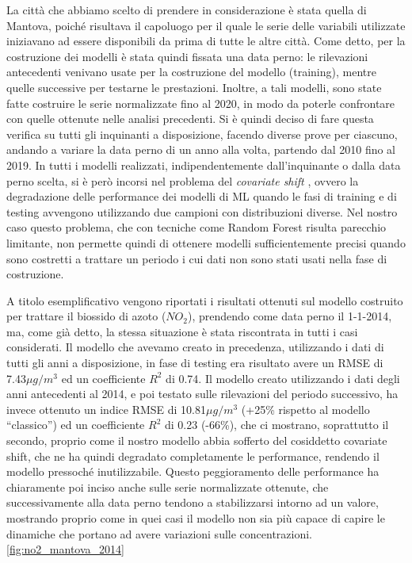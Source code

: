 La città che abbiamo scelto di prendere in considerazione è stata quella di Mantova, poiché risultava il capoluogo per il quale le serie delle variabili utilizzate iniziavano ad essere disponibili da prima di tutte le altre città. Come detto, per la costruzione dei modelli è stata quindi fissata una data perno: le rilevazioni antecedenti venivano usate per la costruzione del modello (training), mentre quelle successive per testarne le prestazioni. Inoltre, a tali modelli, sono state fatte costruire le serie normalizzate fino al 2020, in modo da poterle confrontare con quelle ottenute nelle analisi precedenti.  
Si è quindi deciso di fare questa verifica su tutti gli inquinanti a disposizione, facendo diverse prove per ciascuno, andando a variare la data perno di un anno alla volta, partendo dal 2010 fino al 2019.  
In tutti i modelli realizzati, indipendentemente dall'inquinante o dalla data perno scelta, si è però incorsi nel problema del \textit{covariate shift} \cite{quinonero2009dataset}, ovvero la degradazione delle performance dei modelli di ML quando le fasi di training e di testing avvengono utilizzando due campioni con distribuzioni diverse. Nel nostro caso questo problema, che con tecniche come Random Forest risulta parecchio limitante, non permette quindi di ottenere modelli sufficientemente precisi quando sono costretti a trattare un periodo i cui dati non sono stati usati nella fase di costruzione.

A titolo esemplificativo vengono riportati i risultati ottenuti sul modello costruito per trattare il biossido di azoto ($NO_2$), prendendo come data perno il 1-1-2014, ma, come già detto, la stessa situazione è stata riscontrata in tutti i casi considerati.
Il modello che avevamo creato in precedenza, utilizzando i dati di tutti gli anni a disposizione, in fase di testing era risultato avere un RMSE di 7.43$\mu g/m^3$ ed un coefficiente $R^2$ di 0.74.  
Il modello creato utilizzando i dati degli anni antecedenti al 2014, e poi testato sulle rilevazioni del periodo successivo, ha invece ottenuto un indice RMSE di 10.81$\mu g/m^3$ (+25\% rispetto al modello ``classico'') ed un coefficiente $R^2$ di 0.23 (-66\%), che ci mostrano, soprattutto il secondo, proprio come il nostro modello abbia sofferto del cosiddetto covariate shift, che ne ha quindi degradato completamente le performance, rendendo il modello pressoché inutilizzabile.  
Questo peggioramento delle performance ha chiaramente poi inciso anche sulle serie normalizzate ottenute, che successivamente alla data perno tendono a stabilizzarsi intorno ad un valore, mostrando proprio come in quei casi il modello non sia più capace di capire le dinamiche che portano ad avere variazioni sulle concentrazioni. \ref{fig:no2_mantova_2014}

